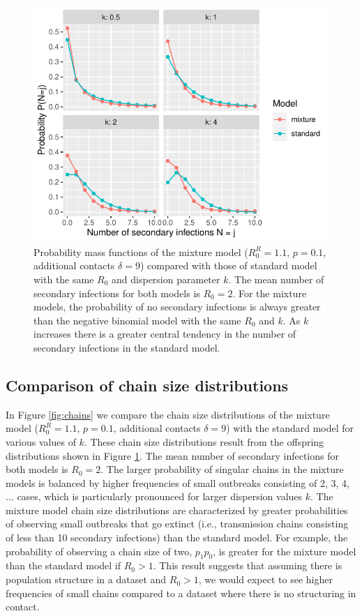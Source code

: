 \documentclass{imammb}
\numberwithin{equation}{section}
\begin{document}
\begin{figure}%
\centering\includegraphics {Figure1.pdf}
\caption{Probability mass functions of the mixture model ($R_0^R=1.1$, $p=0.1$, additional contacts $\delta =9$) compared with those of standard model with the same $R_0$ and dispersion parameter $k$. The mean number of secondary infections for both models is $R_0 =2$. For the mixture models, the probability of no secondary infections is always greater than the negative binomial model with the same $R_0$ and $k$. As $k$ increases there is a greater central tendency in the number of secondary infections in the standard model.  }
\label{fig:pmf}\vspace*{-9pt}
\end{figure}

\subsection{Comparison of chain size distributions}



In Figure \ref{fig:chains} we compare the chain size distributions of the mixture model ($R_0^R=1.1$, $p=0.1$, additional contacts $\delta =9$) with the standard model for various values of $k$. These chain size distributions result from the offspring distributions shown in Figure \ref{fig:pmf}. The mean number of secondary infections for both models is $R_0 =2$. The larger probability of singular chains in the mixture models is balanced by higher frequencies of small outbreaks consisting of 2, 3, 4, $\dots$ cases, which is particularly pronounced for larger dispersion values $k$. The mixture model chain size distributions are characterized by greater probabilities of observing small outbreaks that go extinct (i.e., transmission chains consisting of less than 10 secondary infections) than the standard model. For example, the probability of observing a chain size of two, $p_1 p_0$, is greater for the mixture model than the standard model if $R_0 > 1$. This result suggests that assuming there is population structure in a dataset and $R_0>1$, we would expect to see higher frequencies of small chains compared to a dataset where there is no structuring in contact. %
\end{document}
